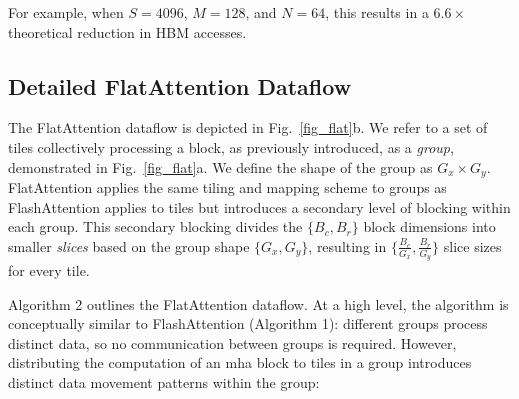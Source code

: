 \documentclass[conference]{IEEEtran}
\begin{document}
For example, when $S = 4096$, $M = 128$, and $N = 64$, this results in a  $6.6\times$ theoretical reduction in HBM accesses.

\subsection{Detailed FlatAttention Dataflow}
\label{subsec:flat}

The FlatAttention dataflow is depicted in Fig.~\ref{fig_flat}b. We refer to a set of tiles collectively processing a block, as previously introduced, as a \textit{group}, demonstrated in Fig.~\ref{fig_flat}a. We define the shape of the group as $G_x \times G_y$. FlatAttention applies the same tiling and mapping scheme to groups as FlashAttention applies to tiles but introduces a secondary level of blocking within each group. This secondary blocking divides the $\{B_c, B_r\}$ block dimensions into smaller \textit{slices} based on the group shape $\{G_x, G_y\}$, resulting in $\{\frac{B_c}{G_x}, \frac{B_r}{G_y}\}$ slice sizes for every tile.

Algorithm 2 outlines the FlatAttention dataflow.
At a high level, the algorithm is conceptually similar to FlashAttention (Algorithm 1): different groups process distinct data, so no communication between groups is required. However, distributing the computation of an \gls{mha} block to tiles in a group introduces distinct data movement patterns within the group:
\end{document}
